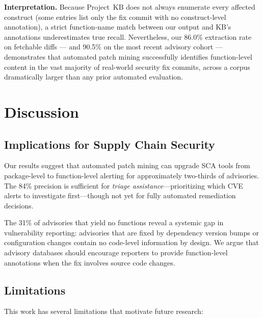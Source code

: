 \documentclass[sigconf,nonacm]{acmart}
\begin{document}
\textbf{Interpretation.}
Because Project~KB does not always enumerate every affected construct
(some entries list only the fix commit with no construct-level annotation),
a strict function-name match between our output and KB's annotations
underestimates true recall.
Nevertheless, our 86.0\% extraction rate on fetchable diffs --- and 90.5\%
on the most recent advisory cohort --- demonstrates that automated patch
mining successfully identifies function-level content in the vast majority
of real-world security fix commits, across a corpus dramatically larger
than any prior automated evaluation.

\section{Discussion}
\label{sec:discussion}

\subsection{Implications for Supply Chain Security}

Our results suggest that automated patch mining can upgrade SCA tools 
from package-level to function-level alerting for approximately two-thirds 
of advisories. The 84\% precision is sufficient for \emph{triage 
assistance}---prioritizing which CVE alerts to investigate first---though 
not yet for fully automated remediation decisions.

The 31\% of advisories that yield no functions reveal a systemic gap in 
vulnerability reporting: advisories that are fixed by dependency version 
bumps or configuration changes contain no code-level information by design. 
We argue that advisory databases should encourage reporters to provide 
function-level annotations when the fix involves source code changes.

\subsection{Limitations}

This work has several limitations that motivate future research:
\end{document}
